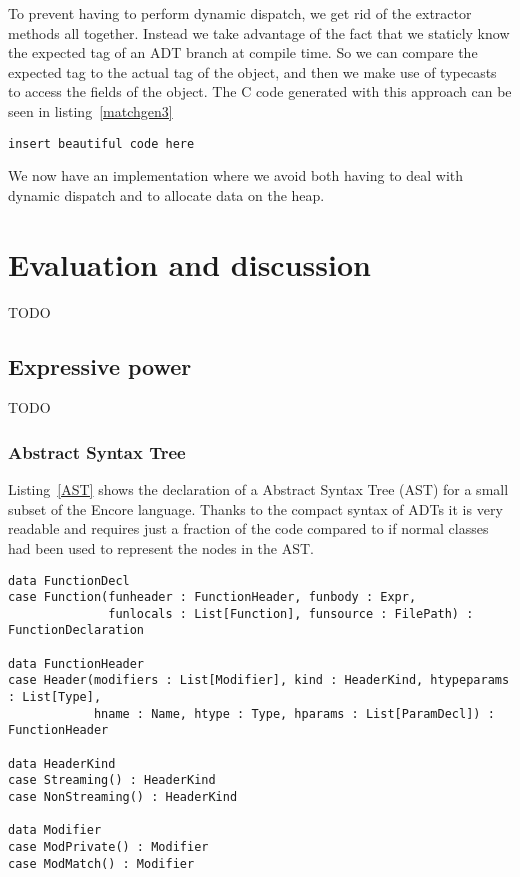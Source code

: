 \documentclass[10pt]{report}
\begin{document}
{\par{To prevent having to perform dynamic dispatch, we get rid of the extractor methods all together. Instead we take advantage of the fact that we staticly know the expected tag of an ADT branch at compile time. So we can compare the expected tag to the actual tag of the object, and then we make use of typecasts to access the fields of the object. The C code generated with this approach can be seen in listing~\ref{matchgen3}}

\begin{lstlisting}[language=encore,caption={Pattern matching on a List},label=matchgen3]
  insert beautiful code here
\end{lstlisting}
\par{We now have an implementation where we avoid both having to deal with dynamic dispatch and to allocate data on the heap.}
\chapter{Evaluation and discussion}
TODO
\section{Expressive power}
TODO
\subsection{Abstract Syntax Tree}
\par{Listing~\ref{AST} shows the declaration of a Abstract Syntax Tree (AST) for a small subset of the Encore language. Thanks to the compact syntax of ADTs it is very readable and requires just a fraction of the code compared to if normal classes had been used to represent the nodes in the AST.}
\begin{lstlisting}[language=encore,caption={Abstract Syntax Tree with ADTs},label=AST]
data FunctionDecl
case Function(funheader : FunctionHeader, funbody : Expr,
              funlocals : List[Function], funsource : FilePath) : FunctionDeclaration

data FunctionHeader
case Header(modifiers : List[Modifier], kind : HeaderKind, htypeparams : List[Type],
            hname : Name, htype : Type, hparams : List[ParamDecl]) : FunctionHeader

data HeaderKind
case Streaming() : HeaderKind
case NonStreaming() : HeaderKind

data Modifier
case ModPrivate() : Modifier
case ModMatch() : Modifier


\end{lstlisting}}
\end{document}
